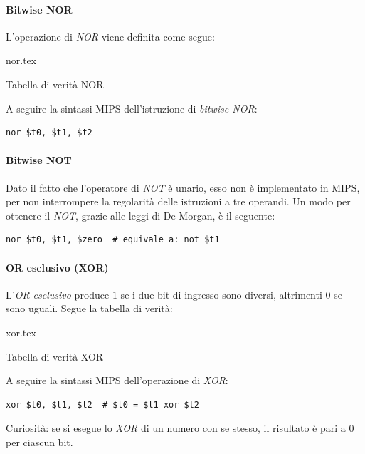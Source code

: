 \documentclass[class=book, crop=false, oneside]{standalone}
\begin{document}
\paragraph{Bitwise NOR}
L'operazione di \emph{NOR} viene definita come segue:
\begin{table}[H]
	\centering
	{nor.tex}
	\caption{Tabella di verità NOR}
\end{table}

A seguire la sintassi MIPS dell'istruzione di \emph{bitwise NOR}:
\begin{verbatim}
nor $t0, $t1, $t2
\end{verbatim}

\paragraph{Bitwise NOT}
Dato il fatto che l'operatore di \emph{NOT} è unario, esso non è implementato in MIPS, per non interrompere la regolarità delle istruzioni a tre operandi. Un modo per ottenere il \emph{NOT}, grazie alle leggi di De Morgan, è il seguente:
\begin{verbatim}
nor $t0, $t1, $zero  # equivale a: not $t1
\end{verbatim}

\paragraph{OR esclusivo (XOR)}
L'\emph{OR esclusivo} produce \(1\) se i due bit di ingresso sono diversi, altrimenti \(0\) se sono uguali. Segue la tabella di verità:
\begin{table}[H]
	\centering
	{xor.tex}
	\caption{Tabella di verità XOR}
\end{table}

A seguire la sintassi MIPS dell'operazione di \emph{XOR}:
\begin{verbatim}
xor $t0, $t1, $t2  # $t0 = $t1 xor $t2
\end{verbatim}

Curiosità: se si esegue lo \emph{XOR} di un numero con se stesso, il risultato è pari a \(0\) per ciascun bit.
\end{document}
